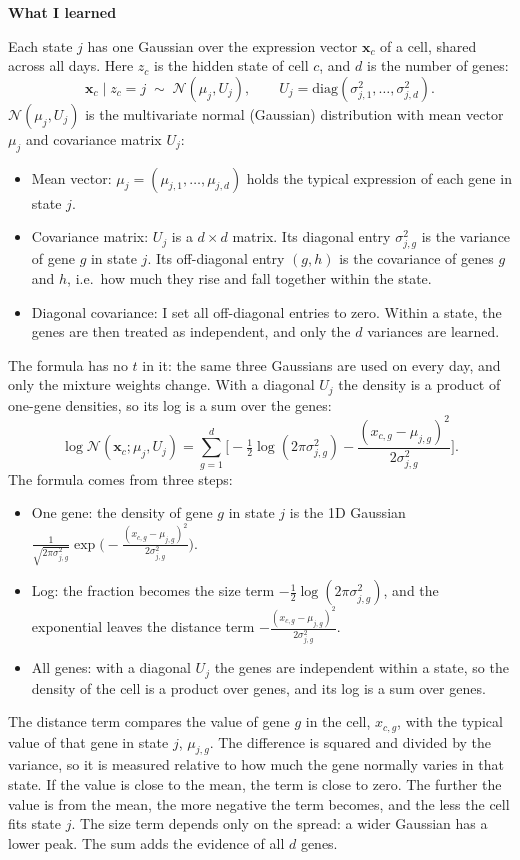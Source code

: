 \documentclass[10pt,a4paper]{article}
\newcommand{\sub}[1]{\vspace{1pt}\textbf{\textcolor{gray!80!black}{#1}}\par}
\begin{document}
\sub{What I learned}
Each state $j$ has one Gaussian over the expression vector $\mathbf{x}_c$ of a cell, shared across all days. Here $z_c$ is the hidden state of cell $c$, and $d$ is the number of genes:
\[
\mathbf{x}_c \mid z_c = j \;\sim\; \mathcal{N}(\mu_j, U_j), \qquad U_j = \mathrm{diag}(\sigma^2_{j,1}, \ldots, \sigma^2_{j,d}).
\]
$\mathcal{N}(\mu_j, U_j)$ is the multivariate normal (Gaussian) distribution with mean vector $\mu_j$ and covariance matrix $U_j$:
\begin{itemize}
  \item Mean vector: $\mu_j = (\mu_{j,1}, \ldots, \mu_{j,d})$ holds the typical expression of each gene in state $j$.
  \item Covariance matrix: $U_j$ is a $d \times d$ matrix. Its diagonal entry $\sigma^2_{j,g}$ is the variance of gene $g$ in state $j$. Its off-diagonal entry $(g, h)$ is the covariance of genes $g$ and $h$, i.e.\ how much they rise and fall together within the state.
  \item Diagonal covariance: I set all off-diagonal entries to zero. Within a state, the genes are then treated as independent, and only the $d$ variances are learned.
\end{itemize}
The formula has no $t$ in it: the same three Gaussians are used on every day, and only the mixture weights change. With a diagonal $U_j$ the density is a product of one-gene densities, so its log is a sum over the genes:
\[
\log \mathcal{N}(\mathbf{x}_c; \mu_j, U_j) = \sum_{g=1}^{d} \Big[ -\tfrac12 \log(2\pi\sigma^2_{j,g}) - \frac{(x_{c,g} - \mu_{j,g})^2}{2\sigma^2_{j,g}} \Big].
\]
The formula comes from three steps:
\begin{itemize}
  \item One gene: the density of gene $g$ in state $j$ is the 1D Gaussian $\frac{1}{\sqrt{2\pi\sigma^2_{j,g}}} \exp\!\big(-\frac{(x_{c,g}-\mu_{j,g})^2}{2\sigma^2_{j,g}}\big)$.
  \item Log: the fraction becomes the size term $-\tfrac12 \log(2\pi\sigma^2_{j,g})$, and the exponential leaves the distance term $-\frac{(x_{c,g}-\mu_{j,g})^2}{2\sigma^2_{j,g}}$.
  \item All genes: with a diagonal $U_j$ the genes are independent within a state, so the density of the cell is a product over genes, and its log is a sum over genes.
\end{itemize}
The distance term compares the value of gene $g$ in the cell, $x_{c,g}$, with the typical value of that gene in state $j$, $\mu_{j,g}$. The difference is squared and divided by the variance, so it is measured relative to how much the gene normally varies in that state. If the value is close to the mean, the term is close to zero. The further the value is from the mean, the more negative the term becomes, and the less the cell fits state $j$. The size term depends only on the spread: a wider Gaussian has a lower peak. The sum adds the evidence of all $d$ genes.
\end{document}
